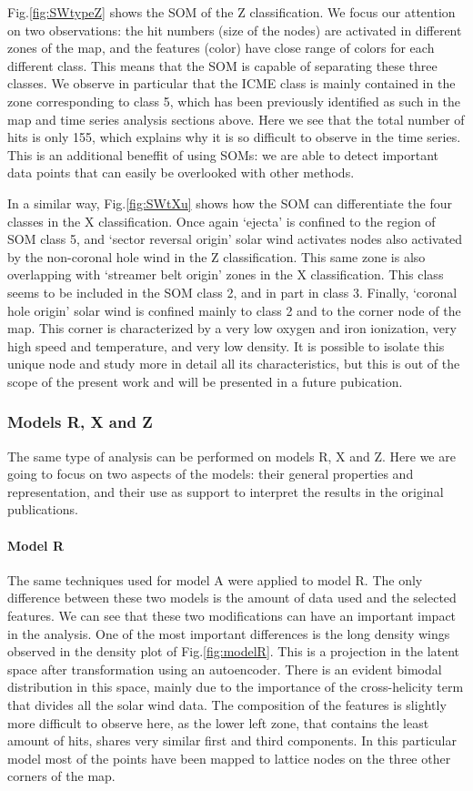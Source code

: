 Fig.\ref{fig:SWtypeZ} shows the SOM of the Z classification. We focus our attention on two observations: the hit numbers (size of the nodes) are activated in different zones of the map, and the features (color) have close range of colors for each different class. This means that the SOM is capable of separating these three classes. We observe in particular that the ICME class is mainly contained in the zone corresponding to class 5, which has been previously identified as such in the map and time series analysis sections above. Here we see that the total number of hits is only 155, which explains why it is so difficult to observe in the time series. This is an additional beneffit of using SOMs: we are able to detect important data points that can easily be overlooked with other methods.

In a similar way, Fig.\ref{fig:SWtXu} shows how the SOM can differentiate the four classes in the X classification. Once again `ejecta' is confined to the region of SOM class 5, and `sector reversal origin' solar wind activates nodes also activated by the non-coronal hole wind in the Z classification. This same zone is also overlapping with `streamer belt origin' zones in the X classification. This class seems to be included in the SOM class 2, and in part in class 3. Finally, `coronal hole origin' solar wind is confined mainly to class 2 and to the corner node of the map. This corner is characterized by a very low oxygen and iron ionization, very high speed and temperature, and very low density. It is possible to isolate this unique node and study more in detail all its characteristics, but this is out of the scope of the present work and will be presented in a future pubication.

\subsubsection{Models R, X and Z}
The same type of analysis can be performed on models R, X and Z. Here we are going to focus on two aspects of the models: their general properties and representation, and their use as support to interpret the results in the original publications.

\paragraph{Model R}
The same techniques used for model A were applied to model R. The only difference between these two models is the amount of data used and the selected features. We can see that these two modifications can have an important impact in the analysis. One of the most important differences is the long density wings observed in the density plot of Fig.\ref{fig:modelR}. This is a projection in the latent space after transformation using an autoencoder. There is an evident bimodal distribution in this space, mainly due to the importance of the cross-helicity term that divides all the solar wind data. The composition of the features is slightly more difficult to observe here, as the lower left zone, that contains the least amount of hits, shares very similar first and third components. In this particular model most of the points have been mapped to lattice nodes on the three other corners of the map.

